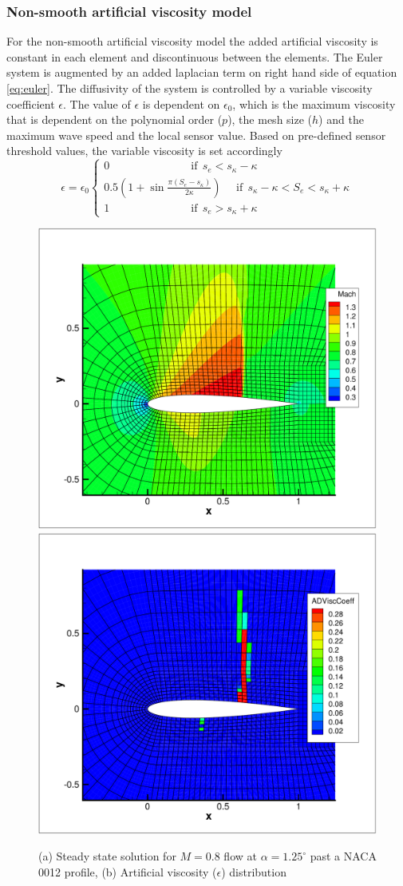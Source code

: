 \subsubsection{Non-smooth artificial viscosity model}
For the non-smooth artificial viscosity model the added artificial viscosity is constant in each element and discontinuous between the elements. The Euler system is augmented by an added laplacian term on right hand side of equation \ref{eq:euler}. The diffusivity of the system is controlled by a variable viscosity coefficient $\epsilon$. The value of $\epsilon$ is dependent on $\epsilon_0$, which is the maximum viscosity that is dependent on the polynomial order ($p$), the mesh size ($h$) and the maximum wave speed and the local sensor value. Based on pre-defined sensor threshold values, the variable viscosity is set accordingly
\begin{equation}
   \epsilon
=\epsilon_0\left \{ \begin{array}{l}
    0\	\	\	\	\	\	\	\	\	\	\	\	\	\	\	\	\	\	\	\	\	\	\	\	\	\	\	\	\	\	\	\	\	 \mbox{if}\		\	 s_e<s_\kappa-\kappa\\  
    0.5\left(1+\sin{\frac{\pi\left(S_e-s_\kappa\right)}{2\kappa}}\right)\	\	\	\	\	\	\mbox{if}\		\	 s_\kappa-\kappa<S_e<s_\kappa+\kappa\\
    1\	\	\	\	\	\	\	\	\	\	\	\	\	\	\	\	\	\	\	\	\	\	\	\	\	\	\	\	\	\	\	\	\	 \mbox{if}\		\ s_e > s_\kappa+\kappa
      \end{array} 
    \right.
\end{equation}
\begin{figure}[!htbp]
\begin{center}
\includegraphics[width = 0.47 \textwidth]{Figures/Mach_P4.pdf}
\includegraphics[width = 0.47 \textwidth]{Figures/ArtVisc_P4.pdf}
\caption{(a) Steady state solution for $M=0.8$ flow at $\alpha = 1.25^\circ$ past a NACA 0012 profile, (b) Artificial viscosity ($\epsilon$) distribution}
\label{fig:}
\end{center}
\end{figure}
